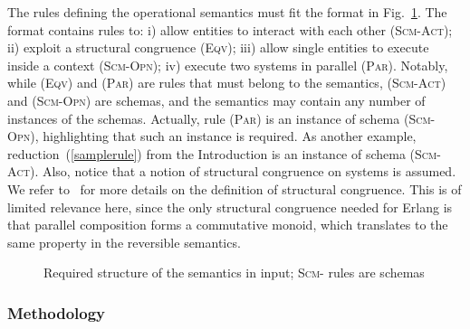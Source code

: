 \documentclass{article}[12pt,a4paper]
\theoremstyle{definition}
\newcommand{\paral}{\;|\;}
\begin{document}

The rules defining the operational semantics must fit the format in Fig.~\ref{fig:forwardrules}.
The format contains rules to: i) allow entities to interact with each other (\textsc{Scm-Act}); ii)
exploit a structural congruence (\textsc{Eqv}); iii) allow single entities to execute inside a context (\textsc{Scm-Opn});
iv) execute two systems in parallel (\textsc{Par}). Notably, while (\textsc{Eqv}) and (\textsc{Par}) are rules that must belong to the semantics, (\textsc{Scm-Act}) and (\textsc{Scm-Opn}) are schemas, and the semantics may contain any number of instances of the schemas. Actually, rule (\textsc{Par}) is an instance of schema (\textsc{Scm-Opn}), highlighting that such an instance is required. As another example, reduction~(\ref{samplerule}) from the Introduction is an instance of schema (\textsc{Scm-Act}).
Also, notice that a notion of structural congruence on systems is assumed.
We refer to~\cite{LaneseM20} for more details on the definition of structural congruence. This is of limited relevance here, since the only structural congruence needed for Erlang is that parallel composition forms a commutative monoid, which translates to the same property in the reversible semantics.

\begin{figure}[t]
  {\footnotesize
    }
  \caption{Required structure of the semantics in input; \textsc{Scm-} rules are schemas}
  \label{fig:forwardrules}
\end{figure}

\subsubsection{Methodology}\label{sec:methodology}
\end{document}
